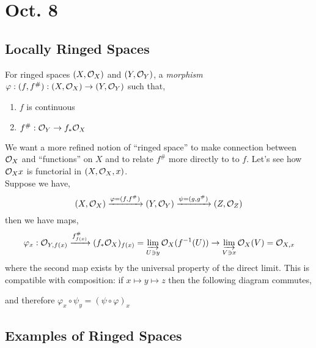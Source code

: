 \documentclass[12pt]{article}
\begin{document}
\section{Oct. 8}

\subsection{Locally Ringed Spaces}

For ringed spaces $(X, \mathcal{O}_{X})$ and $(Y, \mathcal{O}_{Y})$, a \textit{morphism} $\varphi : (f, f^\#) : (X, \mathcal{O}_{X}) \to (Y, \mathcal{O}_{Y})$ such that,
\begin{enumerate}
\item $f$ is continuous
\item $f^\# : \mathcal{O}_{Y} \to f_* \mathcal{O}_{X}$ 
\end{enumerate}
We want a more refined notion of ``ringed space'' to make connection between $\mathcal{O}_{X}$ and ``functions'' on $X$ and to relate $f^\#$ more directly to to $f$. Let's see how $\mathcal{O}_{X}{x}$ is functorial in $(X, \mathcal{O}_{X}, x)$. 
\bigskip\\
Suppose we have, 
\[ (X, \mathcal{O}_{X}) \xrightarrow{\varphi = (f, f^\#)} (Y, \mathcal{O}_{Y}) \xrightarrow{\psi = (g, g^\#)} (Z, \mathcal{O}_{Z}) \]
then we have maps,
\[ \varphi_x : \mathcal{O}_{Y, f(x)} \xrightarrow{f^\#_{f(x)}} (f_* \mathcal{O}_{X})_{f(x)} = \varinjlim_{U \ni y} \mathcal{O}_{X}(f^{-1}(U)) \to \varinjlim_{V \ni x} \mathcal{O}_{X}(V) = \mathcal{O}_{X, x} \]
where the second map exists by the universal property of the direct limit. This is compatible with composition: if $x \mapsto y \mapsto z$ then the following diagram commutes,
\begin{center}
\end{center}
and therefore $\varphi_x \circ \psi_y = (\psi \circ \varphi)_x$

\subsection{Examples of Ringed Spaces}
\end{document}
